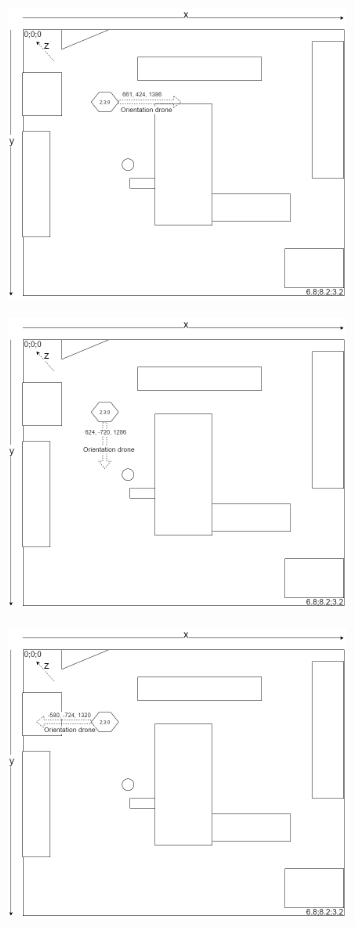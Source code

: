 \documentclass[12pt]{beamer}
\begin{document}
\begin{frame}[allowframebreaks]
    	    \begin{figure}
			    \centering
			    \includegraphics[width=0.8\textwidth]{calibrationMagnetoEst.png}
			\end{figure}
			
    	    \begin{figure}
			    \centering
			    \includegraphics[width=0.8\textwidth]{calibrationMagnetoSud.png}
			\end{figure}
			
    	    \begin{figure}
			    \centering
			    \includegraphics[width=0.8\textwidth]{calibrationMagnetoOuest.png}
			\end{figure}
	\end{frame}
\end{document}
